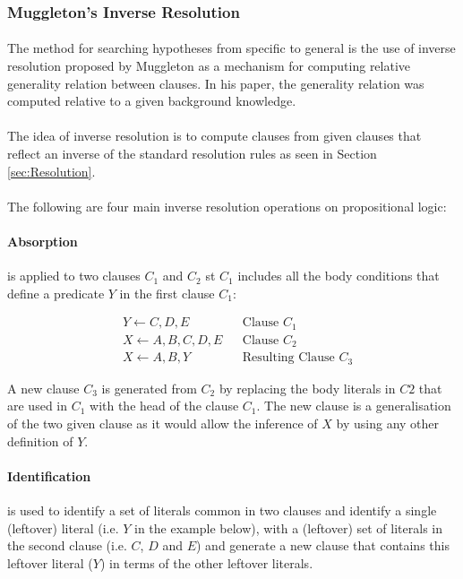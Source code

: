 \documentclass{article}
\theoremstyle{plain}
\theoremstyle{definition}
\begin{document}
\begin{multicols}{2}
\subsubsection{Muggleton's Inverse Resolution}

\paragraph{} The method for searching hypotheses from specific to general is the use of inverse resolution proposed by Muggleton\cite{muggleton95} as a mechanism for computing relative generality relation between clauses. In his paper, the generality relation was computed relative to a given background knowledge.

\paragraph{} The idea of inverse resolution is to compute clauses from given clauses that reflect an inverse of the standard resolution rules as seen in Section \ref{sec:Resolution}. 

\paragraph{} The following are four main inverse resolution operations on propositional logic:

\paragraph{Absorption} is applied to two clauses $C_1$ and $C_2$ st $C_1$ includes all the body conditions that define a predicate $Y$ in the first clause $C_1$:

\begin{align*}
& Y \leftarrow C, D, E && \text{Clause } C_1\\
& X \leftarrow A, B, C, D, E && \text{Clause } C_2\\
& X \leftarrow A, B, Y && \text{Resulting Clause } C_3
\end{align*}

\noindent A new clause $C_3$ is generated from $C_2$ by replacing the body literals in $C2$ that are used in $C_1$ with the head of the clause $C_1$. The new clause is a generalisation of the two given clause as it would allow the inference of $X$ by using any other definition of $Y$.

\paragraph{Identification} is used to identify a set of literals common in two clauses and identify a single (leftover) literal (i.e. $Y$ in the example below), with a (leftover) set of literals in the second clause (i.e. $C$, $D$ and $E$) and generate a new clause that contains this leftover literal ($Y$) in terms of the other leftover literals.


\end{multicols}
\end{document}
